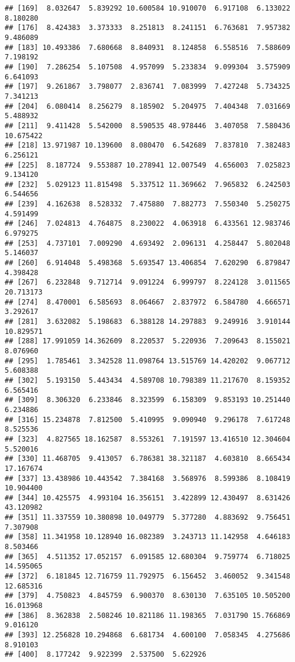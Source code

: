 \documentclass[
]{article}
\begin{document}
\begin{verbatim}
## [169]  8.032647  5.839292 10.600584 10.910070  6.917108  6.133022  8.180280
## [176]  8.424383  3.373333  8.251813  8.241151  6.763681  7.957382  9.486089
## [183] 10.493386  7.680668  8.840931  8.124858  6.558516  7.588609  7.198192
## [190]  7.286254  5.107508  4.957099  5.233834  9.099304  3.575909  6.641093
## [197]  9.261867  3.798077  2.836741  7.083999  7.427248  5.734325  7.341213
## [204]  6.080414  8.256279  8.185902  5.204975  7.404348  7.031669  5.488932
## [211]  9.411428  5.542000  8.590535 48.978446  3.407058  7.580436 10.675422
## [218] 13.971987 10.139600  8.080470  6.542689  7.837810  7.382483  6.256121
## [225]  8.187724  9.553887 10.278941 12.007549  4.656003  7.025823  9.134120
## [232]  5.029123 11.815498  5.337512 11.369662  7.965832  6.242503  6.544656
## [239]  4.162638  8.528332  7.475880  7.882773  7.550340  5.250275  4.591499
## [246]  7.024813  4.764875  8.230022  4.063918  6.433561 12.983746  6.979275
## [253]  4.737101  7.009290  4.693492  2.096131  4.258447  5.802048  5.146037
## [260]  6.914048  5.498368  5.693547 13.406854  7.620290  6.879847  4.398428
## [267]  6.232848  9.712714  9.091224  6.999797  8.224128  3.011565 20.713173
## [274]  8.470001  6.585693  8.064667  2.837972  6.584780  4.666571  3.292617
## [281]  3.632082  5.198683  6.388128 14.297883  9.249916  3.910144 10.829571
## [288] 17.991059 14.362609  8.220537  5.220936  7.209643  8.155021  8.076960
## [295]  1.785461  3.342528 11.098764 13.515769 14.420202  9.067712  5.608388
## [302]  5.193150  5.443434  4.589708 10.798389 11.217670  8.159352  6.565416
## [309]  8.306320  6.233846  8.323599  6.158309  9.853193 10.251440  6.234886
## [316] 15.234878  7.812500  5.410995  9.090940  9.296178  7.617248  8.525536
## [323]  4.827565 18.162587  8.553261  7.191597 13.416510 12.304604  5.520016
## [330] 11.468705  9.413057  6.786381 38.321187  4.603810  8.665434 17.167674
## [337] 13.438986 10.443542  7.384168  3.568976  8.599386  8.108419 10.904400
## [344] 10.425575  4.993104 16.356151  3.422899 12.430497  8.631426 43.120982
## [351] 11.337559 10.380898 10.049779  5.377280  4.883692  9.756451  7.307908
## [358] 11.341958 10.128940 16.082389  3.243713 11.142958  4.646183  8.503466
## [365]  4.511352 17.052157  6.091585 12.680304  9.759774  6.718025 14.595065
## [372]  6.181845 12.716759 11.792975  6.156452  3.460052  9.341548 12.685316
## [379]  4.750823  4.845759  6.900370  8.630130  7.635105 10.505200 16.013968
## [386]  8.362838  2.508246 10.821186 11.198365  7.031790 15.766869  9.016120
## [393] 12.256828 10.294868  6.681734  4.600100  7.058345  4.275686  8.910103
## [400]  8.177242  9.922399  2.537500  5.622926
\end{verbatim}
\end{document}
